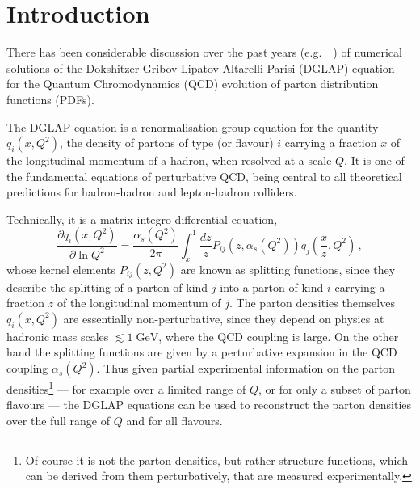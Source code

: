 \documentclass[12pt]{article}
\newcommand{\lp}{\left(}
\newcommand{\rp}{\right)}
\newcommand{\aq}{\alpha_s\left( Q^2 \right)}
\newcommand{\GeV}{\;\mathrm{GeV}}
\newcommand{\as}{\alpha_s}
\newcommand{\eg}{e.g.\ }
\newcommand{\AllDGLAP}{Botje,Schoeffel:1998tz,Pegasus,Pascaud:2001bi,Weinzierl:2002mv,Cafarella:2003jr,Cafarella:2005zj,Cafarella:2008du,GuzziThesis,nnpdf,Kosower:1997hg,Ratcliffe:2000kp}
\begin{document}
\newpage
\tableofcontents


\section{Introduction}
\label{sec:intro}

There has been considerable discussion over the past years
(\eg~\cite{\AllDGLAP}) of numerical solutions of the 
Dokshitzer-Gribov-Lipatov-Altarelli-Parisi (DGLAP)
 equation~\cite{Gribov:1972ri,Altarelli:1977zs,Dokshitzer:1977sg} for the Quantum Chromodynamics
(QCD)
evolution  of parton distribution functions (PDFs).


The DGLAP equation
\cite{Gribov:1972ri,Altarelli:1977zs,Dokshitzer:1977sg} is a renormalisation group equation for the quantity
$q_i(x,Q^2)$, the density of partons of type (or flavour) $i$ carrying
a fraction $x$ of the longitudinal momentum of a hadron, when resolved
at a scale $Q$. It is one of the fundamental equations of perturbative
QCD, being central to all theoretical
predictions for hadron-hadron and lepton-hadron colliders.

Technically, it is a matrix integro-differential equation,
\begin{equation}
  \label{eq:dglap}
  \frac{\partial q_i(x,Q^2)}{\partial \ln Q^2} = \frac{\aq}{2\pi}
 \int_x^1 \frac{dz}{z}
  P_{ij}\lp z,\aq\rp q_j\lp \frac{x}{z},Q^2\rp\,,
\end{equation}
whose kernel elements $P_{ij}(z,Q^2)$ are known as splitting
functions, since they describe the splitting of a parton of kind $j$
into a parton of kind $i$ carrying a fraction $z$ of the longitudinal
momentum of $j$. The parton densities themselves $q_i(x,Q^2)$ are
essentially non-perturbative, since they depend on physics at hadronic
mass scales $\lesssim 1 \GeV$, where the QCD coupling is large. On the
other hand the splitting functions are given by a perturbative
expansion in the QCD coupling $\as(Q^2)$. Thus given partial
experimental information on the parton densities\footnote{Of course it
  is not the parton densities, but rather structure functions, which
  can be derived from them perturbatively, that are measured
  experimentally.} %
--- for example over a limited range of $Q$, or for only a subset of
parton flavours --- the DGLAP equations can be used to reconstruct the
parton densities over the full range of $Q$ and for all flavours.
\end{document}
